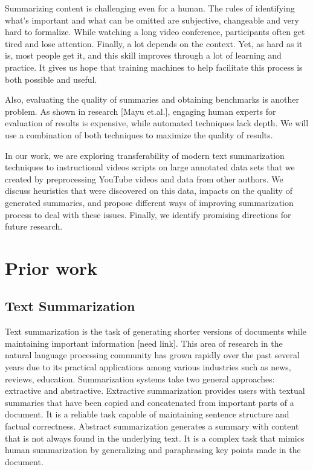 \documentclass{article}
\begin{document}
Summarizing content is challenging even for a human. The rules of identifying what’s important and what can be omitted are subjective, changeable and very hard to formalize. While watching a long video conference, participants often get tired and lose attention. Finally, a lot depends on the context. Yet, as hard as it is, most people get it, and this skill improves through a lot of learning and practice. It gives us hope that training machines to help facilitate this process is both possible and useful. 

Also, evaluating the quality of summaries and obtaining benchmarks is another problem. As shown in research [Mayu et.al.], engaging human experts for evaluation of results is expensive, while automated techniques lack depth. We will use a combination of both techniques to maximize the quality of results. 

In our work, we are exploring transferability of modern text summarization techniques to  instructional videos scripts on large annotated data sets that we created by preprocessing YouTube videos and  data from other authors. We discuss heuristics that were discovered on this data, impacts on the quality of generated summaries, and propose different ways of improving summarization process to deal with these issues. Finally, we identify promising directions for future research.

\section{Prior work}

\subsection{Text Summarization}

Text summarization is the task of generating shorter versions of documents while maintaining important information [need link]. This area of research in the natural language processing community has grown rapidly over the past several years due to its practical applications among various industries such as news, reviews, education. Summarization systems take two general approaches: extractive and abstractive. Extractive summarization provides users with textual summaries that have been copied and concatenated from important parts of a document. It is a reliable task capable of maintaining sentence structure and factual correctness. Abstract summarization generates a summary with content that is not always found in the underlying text. It is a complex task that mimics human summarization by generalizing and paraphrasing key points made in the document. 
\end{document}
